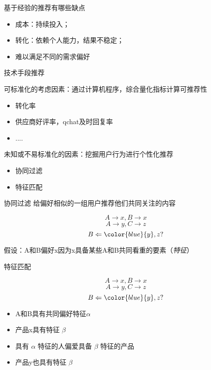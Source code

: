 \documentclass{beamer}
\begin{document}
\begin{CJK}{UTF8}{gbsn}
\begin{frame}{基于经验的推荐有哪些缺点}
  \begin{itemize}
    \item {成本：持续投入；}
    \item {转化：依赖个人能力，结果不稳定；}
    \item {难以满足不同的需求偏好}
  \end{itemize}
\end{frame}


\begin{frame}{技术手段推荐}
  \begin{block}{可标准化的考虑因素：通过计算机程序，综合量化指标计算可推荐性}
    \begin{itemize}
    \item {转化率}
    \item {供应商好评率，qchat及时回复率}
    \item {....}
    \end{itemize}
  \end{block}
  \begin{block}{未知或不易标准化的因素：挖掘用户行为进行个性化推荐}
    \begin{itemize}
      \item {协同过滤}
      \item {特征匹配}
    \end{itemize}
  \end{block}
\end{frame}

\begin{frame}{协同过滤}
  给偏好相似的一组用户推荐他们共同关注的内容

  $$ A \rightarrow x, B \rightarrow x $$
  $$ A \rightarrow y, C \rightarrow z $$
  $$ B \Leftarrow {\color{blue}{y}},z ?$$

  假设：A和B偏好x因为x具备某些A和B共同看重的要素（\emph{特征}）
  
\end{frame}

\begin{frame}{特征匹配}

  $$ A \rightarrow x, B \rightarrow x $$
  $$ A \rightarrow y, C \rightarrow z $$
  $$ B \Leftarrow {\color{blue}{y}},z ?$$

  \begin{itemize}
  \item { A和B具有共同偏好特征$ {\alpha} $ }
  \item { 产品x具有特征 $ {\beta} $ }
  \item { 具有 $ {\alpha} $ 特征的人偏爱具备 $ {\beta} $ 特征的产品 }
  \item { 产品y也具有特征 $ {\beta} $ }
  \end{itemize}


\end{frame}
\end{CJK}
\end{document}
